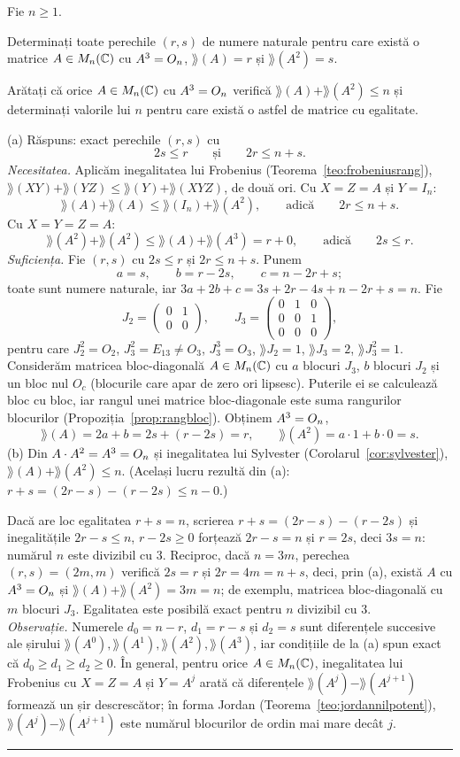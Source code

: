 Fie $n\ge1$.
\begin{parti}
  \item Determinați toate perechile $(r,s)$ de numere naturale pentru care există o matrice $A\in M_n(\mathbb{C})$ cu $A^3=O_n$, $\rang(A)=r$ și $\rang(A^2)=s$.
  \item Arătați că orice $A\in M_n(\mathbb{C})$ cu $A^3=O_n$ verifică $\rang(A)+\rang(A^2)\le n$ și determinați valorile lui $n$ pentru care există o astfel de matrice cu egalitate.
\end{parti}
\sol (a) Răspuns: exact perechile $(r,s)$ cu
\[ 2s\le r\qquad\text{și}\qquad 2r\le n+s. \]
\emph{Necesitatea.} Aplicăm inegalitatea lui Frobenius (Teorema~\ref{teo:frobeniusrang}), $\rang(XY)+\rang(YZ)\le\rang(Y)+\rang(XYZ)$, de două ori. Cu $X=Z=A$ și $Y=I_n$:
\[ \rang(A)+\rang(A)\le\rang(I_n)+\rang(A^2),\qquad\text{adică}\qquad 2r\le n+s. \]
Cu $X=Y=Z=A$:
\[ \rang(A^2)+\rang(A^2)\le\rang(A)+\rang(A^3)=r+0,\qquad\text{adică}\qquad 2s\le r. \]
\emph{Suficiența.} Fie $(r,s)$ cu $2s\le r$ și $2r\le n+s$. Punem
\[ a=s,\qquad b=r-2s,\qquad c=n-2r+s ; \]
toate sunt numere naturale, iar $3a+2b+c=3s+2r-4s+n-2r+s=n$. Fie
\[ J_2=\begin{pmatrix}0&1\\0&0\end{pmatrix},\qquad J_3=\begin{pmatrix}0&1&0\\0&0&1\\0&0&0\end{pmatrix}, \]
pentru care $J_2^2=O_2$, $J_3^2=E_{13}\neq O_3$, $J_3^3=O_3$, $\rang J_2=1$, $\rang J_3=2$, $\rang J_3^2=1$. Considerăm matricea bloc-diagonală $A\in M_n(\mathbb{C})$ cu $a$ blocuri $J_3$, $b$ blocuri $J_2$ și un bloc nul $O_c$ (blocurile care apar de zero ori lipsesc). Puterile ei se calculează bloc cu bloc, iar rangul unei matrice bloc-diagonale este suma rangurilor blocurilor (Propoziția~\ref{prop:rangbloc}). Obținem $A^3=O_n$,
\[ \rang(A)=2a+b=2s+(r-2s)=r,\qquad \rang(A^2)=a\cdot1+b\cdot0=s. \]
(b) Din $A\cdot A^2=A^3=O_n$ și inegalitatea lui Sylvester (Corolarul~\ref{cor:sylvester}), $\rang(A)+\rang(A^2)\le n$. (Același lucru rezultă din (a): $r+s=(2r-s)-(r-2s)\le n-0$.)

Dacă are loc egalitatea $r+s=n$, scrierea $r+s=(2r-s)-(r-2s)$ și inegalitățile $2r-s\le n$, $r-2s\ge0$ forțează $2r-s=n$ și $r=2s$, deci $3s=n$: numărul $n$ este divizibil cu $3$. Reciproc, dacă $n=3m$, perechea $(r,s)=(2m,m)$ verifică $2s=r$ și $2r=4m=n+s$, deci, prin (a), există $A$ cu $A^3=O_n$ și $\rang(A)+\rang(A^2)=3m=n$; de exemplu, matricea bloc-diagonală cu $m$ blocuri $J_3$. Egalitatea este posibilă exact pentru $n$ divizibil cu $3$.\\[2pt]
\emph{Observație.} Numerele $d_0=n-r$, $d_1=r-s$ și $d_2=s$ sunt diferențele succesive ale șirului $\rang(A^0),\rang(A^1),\rang(A^2),\rang(A^3)$, iar condițiile de la (a) spun exact că $d_0\ge d_1\ge d_2\ge0$. În general, pentru orice $A\in M_n(\mathbb{C})$, inegalitatea lui Frobenius cu $X=Z=A$ și $Y=A^j$ arată că diferențele $\rang(A^j)-\rang(A^{j+1})$ formează un șir descrescător; în forma Jordan (Teorema~\ref{teo:jordannilpotent}), $\rang(A^j)-\rang(A^{j+1})$ este numărul blocurilor de ordin mai mare decât $j$.
\vspace{1mm}\hrule

